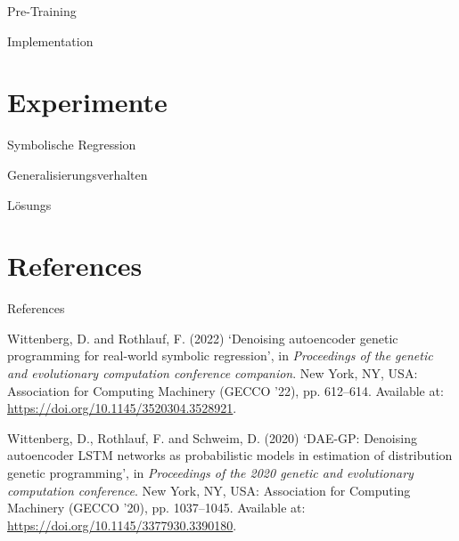 \documentclass[
  ignorenonframetext,
]{beamer}
\newlength{\cslhangindent}
\newlength{\cslentryspacingunit} %
\newenvironment{CSLReferences}[2] %
 {%
  \setlength{\parindent}{0pt}
  \ifodd #1
  \let\oldpar\par
  \def\par{\hangindent=\cslhangindent\oldpar}
  \fi
  \setlength{\parskip}{#2\cslentryspacingunit}
 }%
 {}
\begin{document}
\begin{frame}{Pre-Training}
\protect\hypertarget{pre-training}{}
\end{frame}

\begin{frame}{Implementation}
\protect\hypertarget{implementation}{}
\end{frame}

\hypertarget{experimente}{%
\section{Experimente}\label{experimente}}

\begin{frame}{Symbolische Regression}
\protect\hypertarget{symbolische-regression-1}{}
\end{frame}

\begin{frame}{Generalisierungsverhalten}
\protect\hypertarget{generalisierungsverhalten}{}
\end{frame}

\begin{frame}{Lösungs}
\protect\hypertarget{luxf6sungs}{}
\end{frame}

\hypertarget{references}{%
\section*{References}\label{references}}

\begin{frame}[allowframebreaks]{References}
\hypertarget{refs}{}
\begin{CSLReferences}{0}{0}
\leavevmode{}%
Wittenberg, D. and Rothlauf, F. (2022) {`Denoising autoencoder genetic
programming for real-world symbolic regression'}, in \emph{Proceedings
of the genetic and evolutionary computation conference companion}. New
York, NY, USA: Association for Computing Machinery (GECCO '22), pp.
612--614. Available at: \url{https://doi.org/10.1145/3520304.3528921}.

\leavevmode{}%
Wittenberg, D., Rothlauf, F. and Schweim, D. (2020) {`DAE-GP: Denoising
autoencoder LSTM networks as probabilistic models in estimation of
distribution genetic programming'}, in \emph{Proceedings of the 2020
genetic and evolutionary computation conference}. New York, NY, USA:
Association for Computing Machinery (GECCO '20), pp. 1037--1045.
Available at: \url{https://doi.org/10.1145/3377930.3390180}.

\end{CSLReferences}
\end{frame}
\end{document}
